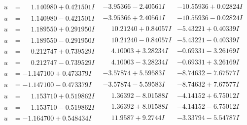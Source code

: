 \documentclass[1p]{elsarticle_modified}
\theoremstyle{definition}
\begin{document}
$$\begin{array}{c|c|c}
\begin{aligned}
u &= \phantom{-}1.140980 + 0.421501 I\end{aligned}
 & -3.95366 - 2.40561 I & -10.55936 + 0.02824 I \\ \hline\begin{aligned}
u &= \phantom{-}1.140980 - 0.421501 I\end{aligned}
 & -3.95366 + 2.40561 I & -10.55936 - 0.02824 I \\ \hline\begin{aligned}
u &= \phantom{-}1.189550 + 0.291950 I\end{aligned}
 & \phantom{-}10.21240 + 0.84057 I & -5.43221 + 0.40339 I \\ \hline\begin{aligned}
u &= \phantom{-}1.189550 - 0.291950 I\end{aligned}
 & \phantom{-}10.21240 - 0.84057 I & -5.43221 - 0.40339 I \\ \hline\begin{aligned}
u &= \phantom{-}0.212747 + 0.739529 I\end{aligned}
 & \phantom{-}4.10003 + 3.28234 I & -0.69331 - 3.26169 I \\ \hline\begin{aligned}
u &= \phantom{-}0.212747 - 0.739529 I\end{aligned}
 & \phantom{-}4.10003 - 3.28234 I & -0.69331 + 3.26169 I \\ \hline\begin{aligned}
u &= -1.147100 + 0.473379 I\end{aligned}
 & -3.57874 + 5.59583 I & -8.74632 - 7.67577 I \\ \hline\begin{aligned}
u &= -1.147100 - 0.473379 I\end{aligned}
 & -3.57874 - 5.59583 I & -8.74632 + 7.67577 I \\ \hline\begin{aligned}
u &= \phantom{-}1.153710 + 0.519862 I\end{aligned}
 & \phantom{-}1.36392 - 8.01588 I & -4.14152 + 6.75012 I \\ \hline\begin{aligned}
u &= \phantom{-}1.153710 - 0.519862 I\end{aligned}
 & \phantom{-}1.36392 + 8.01588 I & -4.14152 - 6.75012 I \\ \hline\begin{aligned}
u &= -1.164700 + 0.548434 I\end{aligned}
 & \phantom{-}11.9587 + 9.2744 I & -3.33794 - 5.54787 I \\ \hline\begin{aligned}

\end{aligned}
\end{array}$$
\end{document}
